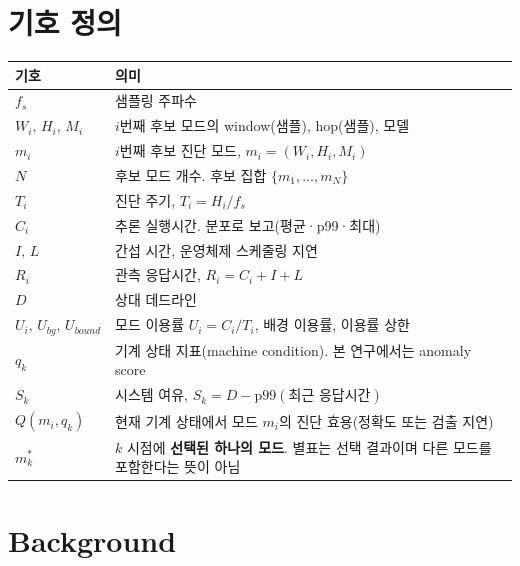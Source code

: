 \documentclass[10pt]{article}
\begin{document}
\section{기호 정의}
\begin{center}\footnotesize
\begin{tabular}{@{}lL{11cm}@{}}
\toprule
기호 & 의미 \\ \midrule
$f_s$ & 샘플링 주파수 \\
$W_i,\,H_i,\,M_i$ & $i$번째 후보 모드의 window(샘플), hop(샘플), 모델 \\
$m_i$ & $i$번째 후보 진단 모드, $m_i=(W_i,H_i,M_i)$ \\
$N$ & 후보 모드 개수. 후보 집합 $\{m_1,\dots,m_N\}$ \\
$T_i$ & 진단 주기, $T_i=H_i/f_s$ \\
$C_i$ & 추론 실행시간. 분포로 보고(평균·p99·최대) \\
$I,\,L$ & 간섭 시간, 운영체제 스케줄링 지연 \\
$R_i$ & 관측 응답시간, $R_i=C_i+I+L$ \\
$D$ & 상대 데드라인 \\
$U_i,\,U_{bg},\,U_{bound}$ & 모드 이용률 $U_i=C_i/T_i$, 배경 이용률, 이용률 상한 \\
$q_k$ & 기계 상태 지표(machine condition). 본 연구에서는 anomaly score \\
$S_k$ & 시스템 여유, $S_k=D-\mathrm{p99}(\text{최근 응답시간})$ \\
$Q(m_i,q_k)$ & 현재 기계 상태에서 모드 $m_i$의 진단 효용(정확도 또는 검출 지연) \\
$m^{*}_k$ & $k$ 시점에 \textbf{선택된 하나의 모드}. 별표는 선택 결과이며 다른 모드를 포함한다는 뜻이 아님 \\
\bottomrule
\end{tabular}
\end{center}

\section{Background}
\end{document}

